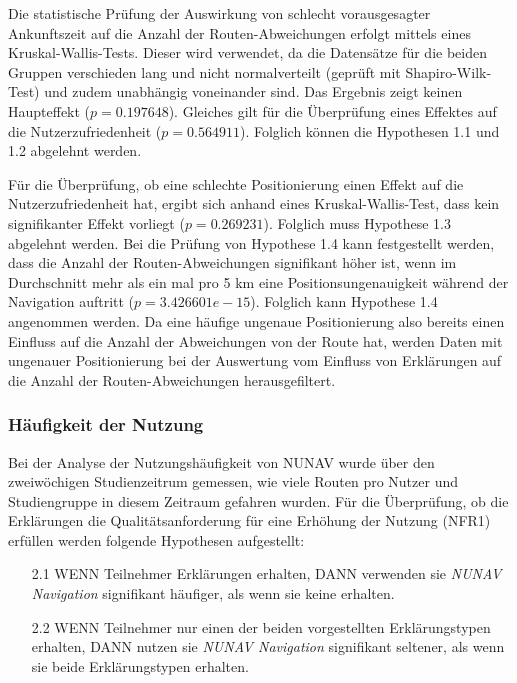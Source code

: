 Die statistische Prüfung der Auswirkung von schlecht vorausgesagter Ankunftszeit auf die Anzahl der Routen-Abweichungen erfolgt mittels eines Kruskal-Wallis-Tests. Dieser wird verwendet, da die Datensätze für die beiden Gruppen verschieden lang und nicht normalverteilt (geprüft mit Shapiro-Wilk-Test) und zudem unabhängig voneinander sind. Das Ergebnis zeigt keinen Haupteffekt ($ p = 0.197648 $). Gleiches gilt für die Überprüfung eines Effektes auf die Nutzerzufriedenheit ($ p = 0.564911 $). Folglich können die Hypothesen 1.1 und 1.2 abgelehnt werden.

Für die Überprüfung, ob eine schlechte Positionierung einen Effekt auf die Nutzerzufriedenheit hat, ergibt sich anhand eines Kruskal-Wallis-Test, dass kein signifikanter Effekt vorliegt ($ p = 0.269231 $). Folglich muss Hypothese 1.3 abgelehnt werden. Bei die Prüfung von Hypothese 1.4 kann festgestellt werden, dass die Anzahl der Routen-Abweichungen signifikant höher ist, wenn im Durchschnitt mehr als ein mal pro 5 km eine Positionsungenauigkeit während der Navigation auftritt ($ p = 3.426601e-15 $). Folglich kann Hypothese 1.4 angenommen werden. Da eine häufige ungenaue Positionierung also bereits einen Einfluss auf die Anzahl der Abweichungen von der Route hat, werden Daten mit ungenauer Positionierung bei der Auswertung vom Einfluss von Erklärungen auf die Anzahl der Routen-Abweichungen herausgefiltert.

\subsubsection{Häufigkeit der Nutzung}
\label{sec:06_model_evaluation:usage_analysis}

Bei der Analyse der Nutzungshäufigkeit von NUNAV wurde über den zweiwöchigen Studienzeitrum gemessen, wie viele Routen pro Nutzer und Studiengruppe in diesem Zeitraum gefahren wurden. Für die Überprüfung, ob die Erklärungen die Qualitätsanforderung für eine Erhöhung der Nutzung (NFR1) erfüllen werden folgende Hypothesen aufgestellt:

\begin{enumerate}
    \item[2.1] WENN Teilnehmer Erklärungen erhalten, DANN verwenden sie \textit{NUNAV Navigation} signifikant häufiger, als wenn sie keine erhalten.
    \item[2.2] WENN Teilnehmer nur einen der beiden vorgestellten Erklärungstypen erhalten, DANN nutzen sie \textit{NUNAV Navigation} signifikant seltener, als wenn sie beide Erklärungstypen erhalten.
\end{enumerate}

